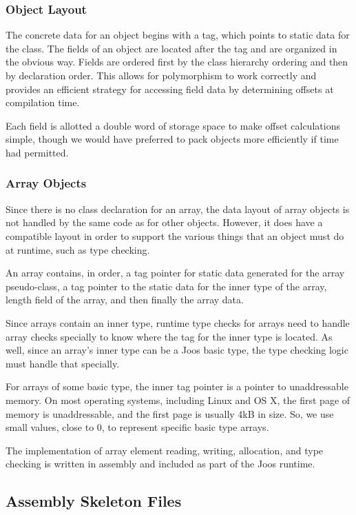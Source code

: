 \documentclass[pdftex,10pt,a4paper]{article}
\begin{document}
\subsubsection{Object Layout}

The concrete data for an object begins with a tag, which points to
static data for the class. The fields of an object are located after
the tag and are organized in the obvious way. Fields are ordered first
by the class hierarchy ordering and then by declaration order. This
allows for polymorphism to work correctly and provides an efficient
strategy for accessing field data by determining offsets at
compilation time.

Each field is allotted a double word of storage space to make offset
calculations simple, though we would have preferred to pack objects
more efficiently if time had permitted.

\subsubsection{Array Objects}

Since there is no class declaration for an array, the data layout of
array objects is not handled by the same code as for other
objects. However, it does have a compatible layout in order to support
the various things that an object must do at runtime, such as type
checking.

An array contains, in order, a tag pointer for static data generated for the
array pseudo-class, a tag pointer to the static data for the inner
type of the array, length field of the array, and then finally the
array data.

Since arrays contain an inner type, runtime type checks for arrays
need to handle array checks specially to know where the tag for the
inner type is located. As well, since an array's inner type can be a
Joos basic type, the type checking logic must handle that specially.

For arrays of some basic type, the inner tag pointer is a pointer to
unaddressable memory. On most operating systems, including Linux and
OS X, the first page of memory is unaddressable, and the first page is
usually 4kB in size. So, we use small values, close to 0, to represent
specific basic type arrays.

The implementation of array element reading, writing, allocation, and
type checking is written in assembly and included as part of the Joos
runtime.

\subsection{Assembly Skeleton Files}
\end{document}
